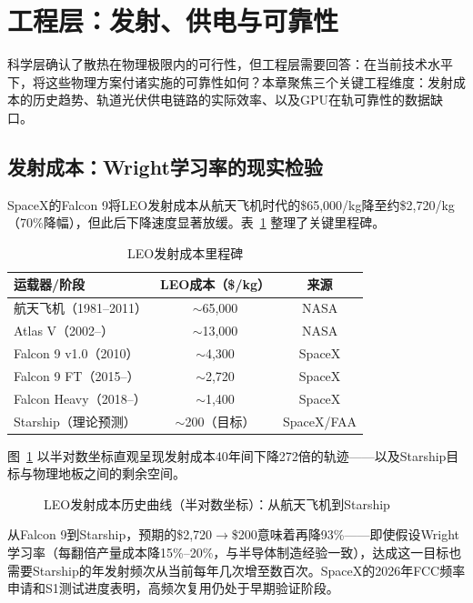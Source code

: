 
\section{工程层：发射、供电与可靠性}

科学层确认了散热在物理极限内的可行性，但工程层需要回答：在当前技术水平下，将这些物理方案付诸实施的可靠性如何？本章聚焦三个关键工程维度：发射成本的历史趋势、轨道光伏供电链路的实际效率、以及GPU在轨可靠性的数据缺口。

\subsection{发射成本：Wright学习率的现实检验}

SpaceX的Falcon 9将LEO发射成本从航天飞机时代的\$65,000/kg降至约\$2,720/kg（70\%降幅），但此后下降速度显著放缓。表~\ref{tab:launch_cost} 整理了关键里程碑。

\begin{table}[H]
\centering
\footnotesize
\caption{LEO发射成本里程碑}
\label{tab:launch_cost}
\begin{tabular}{lcc}
\toprule
\textbf{运载器/阶段} & \textbf{LEO成本（\$/kg）} & \textbf{来源} \\
\midrule
航天飞机（1981--2011） & $\sim$65,000 & NASA\cite{nasalaunch2018} \\
Atlas V（2002--） & $\sim$13,000 & NASA \\
Falcon 9 v1.0（2010） & $\sim$4,300 & SpaceX \\
Falcon 9 FT（2015--） & $\sim$2,720 & SpaceX \\
Falcon Heavy（2018--） & $\sim$1,400 & SpaceX \\
Starship（理论预测） & $\sim$200（目标） & SpaceX/FAA\cite{faa2025boca} \\
\bottomrule
\end{tabular}
\end{table}

图~\ref{fig:launch_cost} 以半对数坐标直观呈现发射成本40年间下降272倍的轨迹——以及Starship目标与物理地板之间的剩余空间。

\begin{figure}[H]
\centering

\caption{LEO发射成本历史曲线（半对数坐标）：从航天飞机到Starship}
\label{fig:launch_cost}
\end{figure}

从Falcon 9到Starship，预期的\$2,720$\rightarrow$\$200意味着再降93\%——即使假设Wright学习率（每翻倍产量成本降15\%--20\%，与半导体制造经验一致\cite{guangfa2026learning}），达成这一目标也需要Starship的年发射频次从当前每年几次增至数百次。SpaceX的2026年FCC频率申请和S1测试进度\cite{spacex2026fcc,spacex2026s1}表明，高频次复用仍处于早期验证阶段。

